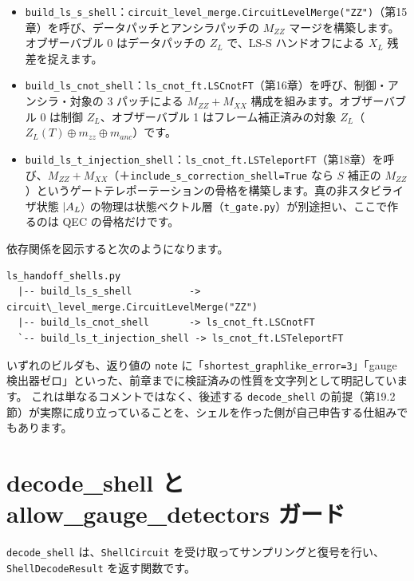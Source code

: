 \begin{itemize}
  \item \texttt{build\_ls\_s\_shell}：\texttt{circuit\_level\_merge.CircuitLevelMerge("ZZ")}（第15章）を呼び、データパッチとアンシラパッチの $M_{ZZ}$ マージを構築します。オブザーバブル 0 はデータパッチの $Z_L$ で、LS-S ハンドオフによる $X_L$ 残差を捉えます。
  \item \texttt{build\_ls\_cnot\_shell}：\texttt{ls\_cnot\_ft.LSCnotFT}（第16章）を呼び、制御・アンシラ・対象の 3 パッチによる $M_{ZZ}+M_{XX}$ 構成を組みます。オブザーバブル 0 は制御 $Z_L$、オブザーバブル 1 はフレーム補正済みの対象 $Z_L$（$Z_L(T)\oplus m_{zz}\oplus m_{anc}$）です。
  \item \texttt{build\_ls\_t\_injection\_shell}：\texttt{ls\_cnot\_ft.LSTeleportFT}（第18章）を呼び、$M_{ZZ}+M_{XX}$（＋\texttt{include\_s\_correction\_shell=True} なら $S$ 補正の $M_{ZZ}$）というゲートテレポーテーションの骨格を構築します。真の非スタビライザ状態 $\ket{A_L}$ の物理は状態ベクトル層（\texttt{t\_gate.py}）が別途担い、ここで作るのは QEC の骨格だけです。
\end{itemize}

依存関係を図示すると次のようになります。

\begin{lstlisting}[language={}, caption={ls\_handoff\_shells.py の依存（src/stages/02\_circuit\_level/README.md に対応）}]
ls_handoff_shells.py
  |-- build_ls_s_shell          -> circuit\_level_merge.CircuitLevelMerge("ZZ")
  |-- build_ls_cnot_shell       -> ls_cnot_ft.LSCnotFT
  `-- build_ls_t_injection_shell -> ls_cnot_ft.LSTeleportFT
\end{lstlisting}

いずれのビルダも、返り値の \texttt{note} に「\texttt{shortest\_graphlike\_error=3}」「gauge 検出器ゼロ」といった、前章までに検証済みの性質を文字列として明記しています。
これは単なるコメントではなく、後述する \texttt{decode\_shell} の前提（第19.2節）が実際に成り立っていることを、シェルを作った側が自己申告する仕組みでもあります。

\section{decode\_shell と allow\_gauge\_detectors ガード}\label{sec:decode_shell}

\texttt{decode\_shell} は、\texttt{ShellCircuit} を受け取ってサンプリングと復号を行い、\texttt{ShellDecodeResult} を返す関数です。

